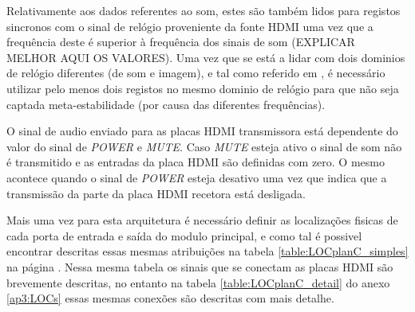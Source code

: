 Relativamente aos dados referentes ao som, estes são também lidos para registos sincronos com o sinal de relógio proveniente da fonte HDMI uma vez que a frequência deste é superior à frequência dos sinais de som (EXPLICAR MELHOR AQUI OS VALORES). Uma vez que se está a lidar com dois dominios de relógio diferentes (de som e imagem), e tal como referido em \cite{R024}, é necessário utilizar pelo menos dois registos no mesmo dominio de relógio para que não seja captada meta-estabilidade (por causa das diferentes frequências).

O sinal de audio enviado para as placas HDMI transmissora está dependente do valor do sinal de \textit{POWER} e \textit{MUTE}. Caso \textit{MUTE} esteja ativo o sinal de som não é transmitido e as entradas da placa HDMI são definidas com zero. O mesmo acontece quando o sinal de \textit{POWER} esteja desativo uma vez que indica que a transmissão da parte da placa HDMI recetora está desligada.

Mais uma vez para esta arquitetura é necessário definir as localizações fisicas de cada porta de entrada e saída do modulo principal, e como tal é possivel encontrar descritas essas mesmas atribuições na tabela \ref{table:LOCplanC_simples} na página \pageref{table:LOCplanC_simples}. Nessa mesma tabela os sinais que se conectam as placas HDMI são brevemente descritas, no entanto na tabela \ref{table:LOCplanC_detail} do anexo \ref{ap3:LOCs} essas mesmas conexões são descritas com mais detalhe.

